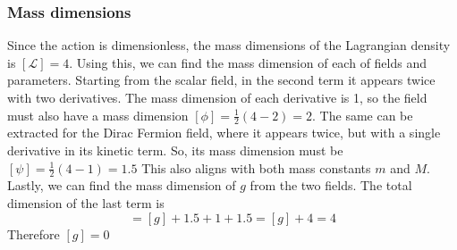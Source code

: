 \documentclass{article}
\begin{document}
\subsubsection{Mass dimensions}
Since the action is dimensionless, the mass dimensions of the Lagrangian density is $\left[\mathcal{L}\right] = 4$. Using this, we can find the mass dimension of each of fields and parameters.
\newline
Starting from the scalar field, in the second term it appears twice with two derivatives. The mass dimension of each derivative is 1, so the field must also have a mass dimension $\left[\phi\right] = \frac{1}{2}(4 - 2) = 2$. The same can be extracted for the Dirac Fermion field, where it appears twice, but with a single derivative in its kinetic term. So, its mass dimension must be $\left[\psi\right] = \frac{1}{2}(4 - 1) = 1.5$
This also aligns with both mass constants $m$ and $M$.
\newline
Lastly, we can find the mass dimension of $g$ from the two fields. The total dimension of the last term is
\begin{equation}
    [g\phi\bar{\psi}\gamma^5\psi] = [g] + 1.5 + 1 + 1.5 = [g] + 4 = 4
\end{equation}
Therefore $[g] = 0$
\end{document}
